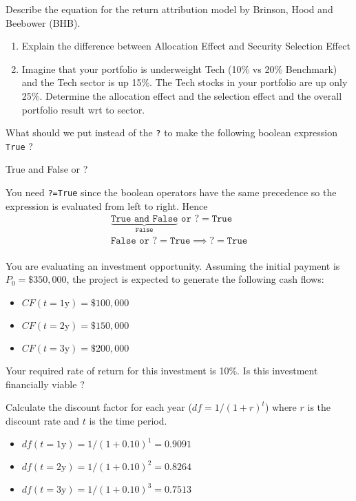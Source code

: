 \documentclass[12pt,a4paper]{exam}
\begin{document}
\begin{questions}
\begin{enumerate}
\end{enumerate}
\makeemptybox{5cm}



\question Describe the equation for the return attribution model by Brinson, Hood and Beebower (BHB). 
\begin{enumerate}[label=(\alph*),font=\itshape]
\item Explain the difference between Allocation Effect and Security Selection Effect 
\item Imagine that your portfolio is underweight Tech (10\% vs 20\% Benchmark) and the Tech sector is up 15\%. The Tech stocks in your portfolio are up only 25\%. Determine the allocation effect and the selection effect and the overall portfolio result wrt to sector.
\end{enumerate}
\makeemptybox{5cm}

\question
What should we put instead of the \texttt{?} to make the following boolean expression \texttt{True} ?
\begin{ipython}
True and False or ?
\end{ipython}
\makeemptybox{5cm}
\begin{solution}
You need \texttt{?=True} since the boolean operators have the same precedence so the expression is evaluated from left to right.
Hence
\begin{equation*}
  \begin{gathered}
    \underbrace{\texttt{True and False}}_{\texttt{False}}\texttt{ or ?} = \texttt{True} \\
    \texttt{False or ?} = \texttt{True} \implies \texttt{?} = \texttt{True} \\
    \end{gathered}
\end{equation*}
\end{solution}

\question
You are evaluating an investment opportunity. Assuming the initial payment is $P_0 = \$350,000$, the project is expected to generate the following cash flows:
\begin{itemize}
\item $CF(t=\text{1y})=\$100,000$
\item $CF(t=\text{2y})=\$150,000$
\item $CF(t=\text{3y})=\$200,000$
\end{itemize}
Your required rate of return for this investment is 10\%. Is this investment financially viable ?
\makeemptybox{5cm}
\begin{solution}
Calculate the discount factor for each year ($df=1 / (1 + r)^t$) where $r$ is the discount rate and $t$ is the time period.
\begin{itemize}
\item $df(t=\text{1y})=1 / (1 + 0.10)^1 = 0.9091$
\item $df(t=\text{2y})=1 / (1 + 0.10)^2 = 0.8264$
\item $df(t=\text{3y})=1 / (1 + 0.10)^3 = 0.7513$
\end{itemize}


\end{solution}
\end{questions}
\end{document}
